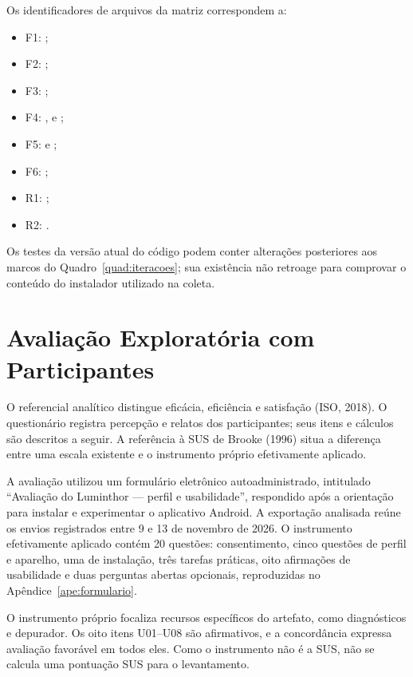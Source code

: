 \documentclass[
    12pt
    ,oneside
    ,a4paper
    ,chapter=TITLE
    ,section=TITLE
    ,sumario=abnt-6027-2012]{abntex2}
\begin{document}
Os identificadores de arquivos da matriz correspondem a:
\begin{itemize}
    \raggedright
    \item F1: ;
    \item F2: ;
    \item F3: ;
    \item F4: , 
    e ;
    \item F5:  e ;
    \item F6: ;
    \item R1: ;
    \item R2: .
\end{itemize}

Os testes da versão atual do código podem conter alterações posteriores aos marcos do
Quadro~\ref{quad:iteracoes}; sua existência não retroage para comprovar o conteúdo
do instalador utilizado na coleta.

\section{Avaliação Exploratória com Participantes}
\label{sec:avaliacao_usuarios}

O referencial analítico distingue eficácia, eficiência e satisfação (ISO, 2018).
O questionário registra percepção e relatos dos participantes; seus itens e
cálculos são descritos a seguir. A referência à SUS de Brooke (1996) situa a
diferença entre uma escala existente e o instrumento próprio efetivamente aplicado.

A avaliação utilizou um formulário eletrônico autoadministrado, intitulado ``Avaliação do
Luminthor --- perfil e usabilidade'', respondido após a orientação para instalar e experimentar
o aplicativo Android. A exportação analisada reúne os envios registrados entre 9 e 13 de
novembro de 2026. O instrumento efetivamente aplicado contém 20 questões: consentimento,
cinco questões de perfil e aparelho, uma de instalação, três tarefas práticas, oito afirmações
de usabilidade e duas perguntas abertas opcionais, reproduzidas no
Apêndice~\ref{ape:formulario}.

O instrumento próprio focaliza recursos específicos do artefato, como diagnósticos e depurador. Os oito itens U01--U08 são afirmativos, e a concordância expressa avaliação favorável em todos eles. Como o instrumento não é a SUS, não se calcula uma pontuação SUS para o levantamento.
\end{document}
